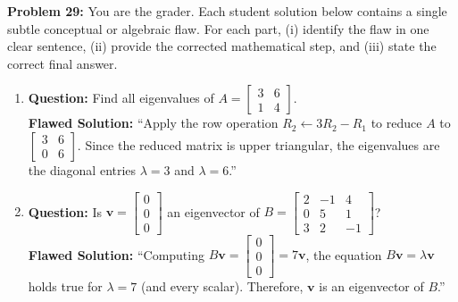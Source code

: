 \documentclass[11pt, letterpaper]{article}
\theoremstyle{definition}
\theoremstyle{remark}
\begin{document}
\textbf{Problem 29:}
You are the grader. Each student solution below contains a single subtle conceptual or algebraic flaw. For each part, (i) identify the flaw in one clear sentence, (ii) provide the corrected mathematical step, and (iii) state the correct final answer.
\begin{enumerate}[label=(\alph*)]
    \item \textbf{Question:} Find all eigenvalues of $A = \begin{bmatrix} 3 & 6 \\ 1 & 4 \end{bmatrix}$.\\
    \textbf{Flawed Solution:} ``Apply the row operation $R_2 \leftarrow 3R_2 - R_1$ to reduce $A$ to $\begin{bmatrix} 3 & 6 \\ 0 & 6 \end{bmatrix}$. Since the reduced matrix is upper triangular, the eigenvalues are the diagonal entries $\lambda = 3$ and $\lambda = 6$.''
    \item \textbf{Question:} Is $\mathbf{v} = \begin{bmatrix} 0 \\ 0 \\ 0 \end{bmatrix}$ an eigenvector of $B = \begin{bmatrix} 2 & -1 & 4 \\ 0 & 5 & 1 \\ 3 & 2 & -1 \end{bmatrix}$?\\
    \textbf{Flawed Solution:} ``Computing $B\mathbf{v} = \begin{bmatrix} 0 \\ 0 \\ 0 \end{bmatrix} = 7\mathbf{v}$, the equation $B\mathbf{v} = \lambda\mathbf{v}$ holds true for $\lambda = 7$ (and every scalar). Therefore, $\mathbf{v}$ is an eigenvector of $B$.''
\end{enumerate}
\end{document}
